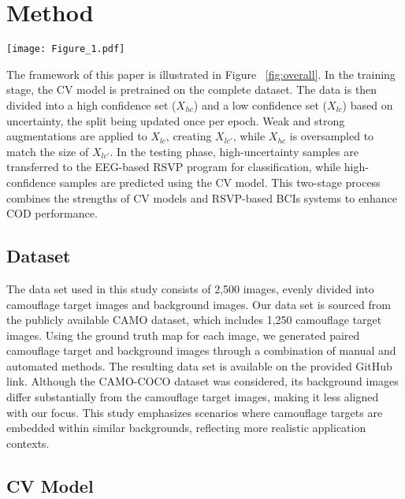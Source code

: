 \documentclass[preprint,12pt,authoryear]{elsarticle}
\begin{document}
\section{Method}
\begin{figure*}[ht]
    \centering
    \texttt{[image: Figure\_1.pdf]} %
    \caption{Overall framework of this study. During training, the dataset is split into high and low-confidence sets, with augmentations applied to low-confidence samples and the split updated per epoch; during testing, high-uncertainty samples are classified using the RSVP program, while high-confidence samples are handled by the CV model, enhancing COD performance.}
    \label{fig:overall}
\end{figure*}
The framework of this paper is illustrated in Figure
~\ref{fig:overall}. In the training stage, the CV model is pretrained on the complete dataset. The data is then divided into a high confidence set (\(X_{hc}\)) and a low confidence set (\(X_{lc}\)) based on uncertainty, the split being updated once per epoch. Weak and strong augmentations are applied to \(X_{lc}\), creating \(X_{lc'}\), while \(X_{hc}\) is oversampled to match the size of \(X_{lc'}\). In the testing phase, high-uncertainty samples are transferred to the EEG-based RSVP program for classification, while high-confidence samples are predicted using the CV model. This two-stage process combines the strengths of CV models and RSVP-based BCIs systems to enhance COD performance.

\subsection{Dataset}
The data set used in this study consists of 2,500 images, evenly divided into camouflage target images and background images. Our data set is sourced from the publicly available CAMO dataset, which includes 1,250 camouflage target images. Using the ground truth map for each image, we generated paired camouflage target and background images through a combination of manual and automated methods. The resulting data set is available on the provided GitHub link. Although the CAMO-COCO dataset was considered, its background images differ substantially from the camouflage target images, making it less aligned with our focus. This study emphasizes scenarios where camouflage targets are embedded within similar backgrounds, reflecting more realistic application contexts.

\subsection{CV Model}
\end{document}
